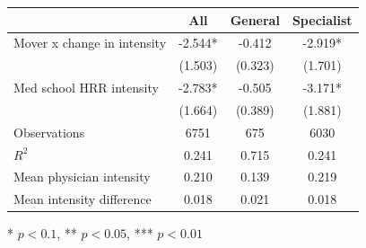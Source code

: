 \begin{table}[t]
\fontsize{12.0pt}{14.0pt}\selectfont
\begin{tabular*}{\linewidth}{@{\extracolsep{\fill}}lccc}
\toprule
  & All & General & Specialist \\ 
\midrule\addlinespace[2.5pt]
Mover x change in intensity & -2.544* & -0.412 & -2.919* \\ 
 & (1.503) & (0.323) & (1.701) \\ 
Med school HRR intensity & -2.783* & -0.505 & -3.171* \\ 
{} & {(1.664)} & {(0.389)} & {(1.881)} \\ 
\midrule
Observations & 6751 & 675 & 6030 \\ 
$R^2$ & 0.241 & 0.715 & 0.241 \\ 
Mean physician intensity & 0.210 & 0.139 & 0.219 \\ 
Mean intensity difference & 0.018 & 0.021 & 0.018 \\ 
\bottomrule
\end{tabular*}
\begin{minipage}{\linewidth}
* $p < 0.1$, ** $p < 0.05$, *** $p < 0.01$\\
\end{minipage}
\end{table}

